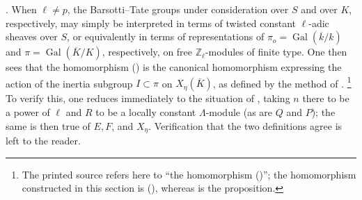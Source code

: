 \medskip
\noindent
{}. When $\ell\neq p$, the Barsotti--Tate groups under consideration
over $S$ and over $K$, respectively, may simply be interpreted in terms of
twisted constant $\ell$-adic sheaves over $S$, or equivalently in terms of
representations of
$\pi_o=\operatorname{Gal}(\overline k/k)$ and
$\pi=\operatorname{Gal}(\overline K/K)$, respectively, on free
$\mathbb Z_\ell$-modules of finite type. One then sees that the homomorphism
() is the canonical homomorphism expressing the action of the inertia
subgroup $I\subset\pi$ on $X_\eta(\overline K)$, as defined by the method
of .
\footnote{The printed source refers here to ``the homomorphism ()'';
the homomorphism constructed in this section is (), whereas  is
the proposition.}
To verify this, one reduces immediately to the situation of , taking
$n$ there to be a power of $\ell$ and $R$ to be a locally constant
$\Lambda$-module (as are $Q$ and $P$); the same is then true of $E,F$, and
$X_\eta$. Verification that the two definitions agree is left to the
reader.
